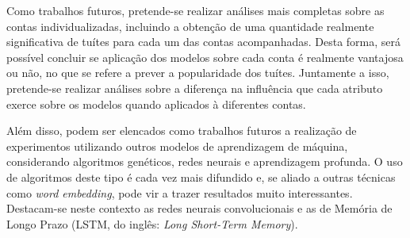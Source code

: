 \documentclass[oneside,openright,12pt]{ufsm_2015} %
\begin{document}
    \par Como trabalhos futuros, pretende-se realizar análises mais completas sobre as contas individualizadas, incluindo a obtenção de uma quantidade realmente significativa de tuítes para cada um das contas acompanhadas. Desta forma, será possível concluir se aplicação dos modelos sobre cada conta é realmente vantajosa ou não, no que se refere a prever a popularidade dos tuítes. Juntamente a isso, pretende-se realizar análises sobre a diferença na influência que cada atributo exerce sobre os modelos quando aplicados à diferentes contas.
    
    \par Além disso, podem ser elencados como trabalhos futuros a realização de experimentos utilizando outros modelos de aprendizagem de máquina, considerando algoritmos genéticos, redes neurais e aprendizagem profunda. O uso de algoritmos deste tipo é cada vez mais difundido e, se aliado a outras técnicas como \textit{word embedding}, pode vir a trazer resultados muito interessantes. Destacam-se neste contexto as redes neurais convolucionais e as de Memória de Longo Prazo (LSTM, do inglês: \textit{Long Short-Term Memory}).




	
\apendice %

        
\end{document}
